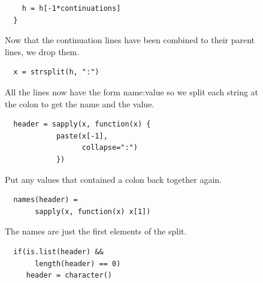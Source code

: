 \begin{figure}
\begin{minipage}{15cm}
\begin{minipage}[t]{9cm}
\begin{verbatim}
    h = h[-1*continuations]
  } 
\end{verbatim}
\end{minipage}
\begin{minipage}[t]{6cm}
{\footnotesize{
Now that the continuation lines have been combined
to their parent lines, we drop them. 
}}
\\
\end{minipage}

   
\begin{minipage}[t]{9cm}
\begin{verbatim}
  x = strsplit(h, ":")
\end{verbatim}
\end{minipage}
\begin{minipage}[t]{6cm}
{\footnotesize{
All the lines now have the form
name:value so we split each string at 
the colon to get the name and the value.
}}
\\
\end{minipage}

\begin{minipage}[t]{9cm}
\begin{verbatim}
  header = sapply(x, function(x) {
            paste(x[-1],
                  collapse=":")
            })
\end{verbatim}
\end{minipage}
\begin{minipage}[t]{6cm}
{\footnotesize{
Put any values that contained a colon back together again.
}}
\\
\end{minipage}

\begin{minipage}[t]{9cm}
\begin{verbatim}
  names(header) = 
       sapply(x, function(x) x[1])
\end{verbatim}
\end{minipage}
\begin{minipage}[t]{6cm}
{\footnotesize{
The names are just the first elements of the split.
}}
\\
\end{minipage}

\begin{minipage}[t]{9cm}
\begin{verbatim}
  if(is.list(header) && 
       length(header) == 0)
     header = character()
   

\end{verbatim}
\end{minipage}
\end{minipage}
\end{figure}
